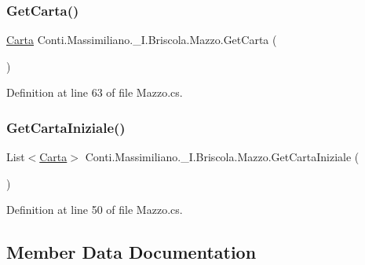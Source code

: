 \subsubsection{\texorpdfstring{Get\+Carta()}{GetCarta()}}
{\footnotesize\ttfamily \hyperlink{class_conti_1_1_massimiliano_1_1__5_i_1_1_briscola_1_1_carta}{Carta} Conti.\+Massimiliano.\+\_\+I.\+Briscola.\+Mazzo.\+Get\+Carta (\begin{DoxyParamCaption}{ }\end{DoxyParamCaption})}



Definition at line 63 of file Mazzo.\+cs.

\hypertarget{class_conti_1_1_massimiliano_1_1__5_i_1_1_briscola_1_1_mazzo_ab25d55a44d733891ccb9c9a899fd38f3}{}\label{class_conti_1_1_massimiliano_1_1__5_i_1_1_briscola_1_1_mazzo_ab25d55a44d733891ccb9c9a899fd38f3} 
\subsubsection{\texorpdfstring{Get\+Carta\+Iniziale()}{GetCartaIniziale()}}
{\footnotesize\ttfamily List$<$\hyperlink{class_conti_1_1_massimiliano_1_1__5_i_1_1_briscola_1_1_carta}{Carta}$>$ Conti.\+Massimiliano.\+\_\+I.\+Briscola.\+Mazzo.\+Get\+Carta\+Iniziale (\begin{DoxyParamCaption}{ }\end{DoxyParamCaption})}



Definition at line 50 of file Mazzo.\+cs.



\subsection{Member Data Documentation}
\hypertarget{class_conti_1_1_massimiliano_1_1__5_i_1_1_briscola_1_1_mazzo_a93b3bb3e4836036324625d2db7208e9b}{}\label{class_conti_1_1_massimiliano_1_1__5_i_1_1_briscola_1_1_mazzo_a93b3bb3e4836036324625d2db7208e9b} 
